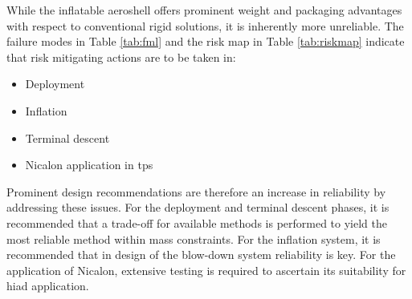While the inflatable aeroshell offers prominent weight and packaging advantages with respect to conventional rigid solutions, it is inherently more unreliable. The failure modes in Table \ref{tab:fml} and the risk map in Table \ref{tab:riskmap} indicate that risk mitigating actions are to be taken in:
\begin{itemize}
\item Deployment
\item Inflation
\item Terminal descent
\item Nicalon application in \gls{tps}
\end{itemize}
Prominent design recommendations are therefore an increase in reliability by addressing these issues. For the deployment and terminal descent phases, it is recommended that a trade-off for available methods is performed to yield the most reliable method within mass constraints. For the inflation system, it is recommended that in design of the blow-down system reliability is key. For the application of Nicalon, extensive testing is required to ascertain its suitability for \gls{hiad} application.